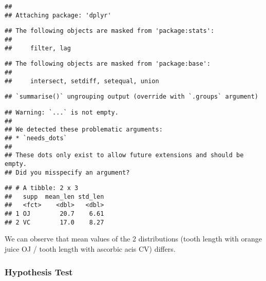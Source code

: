 \documentclass[
]{article}
\newenvironment{Shaded}{\begin{snugshade}}{\end{snugshade}}
\newcommand{\CommentTok}[1]{\textcolor[rgb]{0.56,0.35,0.01}{\textit{#1}}}
\newcommand{\DataTypeTok}[1]{\textcolor[rgb]{0.13,0.29,0.53}{#1}}
\newcommand{\KeywordTok}[1]{\textcolor[rgb]{0.13,0.29,0.53}{\textbf{#1}}}
\newcommand{\NormalTok}[1]{#1}
\newcommand{\OperatorTok}[1]{\textcolor[rgb]{0.81,0.36,0.00}{\textbf{#1}}}
\newcommand{\StringTok}[1]{\textcolor[rgb]{0.31,0.60,0.02}{#1}}
\begin{document}
\begin{verbatim}
## 
## Attaching package: 'dplyr'
\end{verbatim}

\begin{verbatim}
## The following objects are masked from 'package:stats':
## 
##     filter, lag
\end{verbatim}

\begin{verbatim}
## The following objects are masked from 'package:base':
## 
##     intersect, setdiff, setequal, union
\end{verbatim}

\begin{Shaded}
\end{Shaded}

\begin{verbatim}
## `summarise()` ungrouping output (override with `.groups` argument)
\end{verbatim}

\begin{verbatim}
## Warning: `...` is not empty.
## 
## We detected these problematic arguments:
## * `needs_dots`
## 
## These dots only exist to allow future extensions and should be empty.
## Did you misspecify an argument?
\end{verbatim}

\begin{verbatim}
## # A tibble: 2 x 3
##   supp  mean_len std_len
##   <fct>    <dbl>   <dbl>
## 1 OJ        20.7    6.61
## 2 VC        17.0    8.27
\end{verbatim}

We can observe that mean values of the 2 distributions (tooth length
with orange juice OJ / tooth length with ascorbic acis CV) differs.

\hypertarget{hypothesis-test}{%
\subsubsection{Hypothesis Test}\label{hypothesis-test}}
\end{document}
